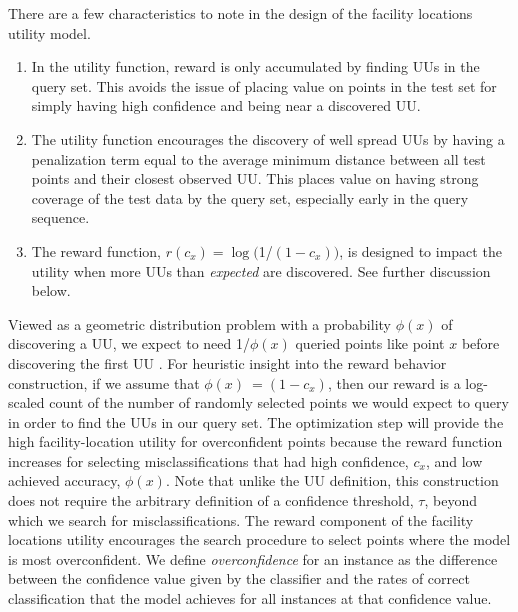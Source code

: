 \documentclass[10pt, conference]{IEEEtran}
\begin{document}
There are a few characteristics to note in the design of the facility locations utility model. 
\begin{enumerate}
	\item In the utility function, reward is only accumulated by finding UUs in the query set.  This avoids the issue of placing value on points in the test set for simply having high confidence and being near a discovered UU. 
	\item The utility function encourages the discovery of well spread UUs by having a penalization term equal to the average minimum distance between all test points and their closest observed UU. This places value on having strong coverage of the test data by the query set, especially early in the query sequence. 
	\item The reward function, $r\left(c_x\right) = \log($1/$(1-c_x))$, is designed to impact the utility when more UUs than {\it expected} are discovered.  See further discussion below. 

\end{enumerate}

Viewed as a geometric distribution problem with a probability $\phi(x)$ of discovering a UU, we expect to need 1/$\phi(x)$ queried points like point $x$ before discovering the first UU \cite{casella2002statistical}.  For heuristic insight into the reward behavior construction, if we assume that   $\phi(x) ~= (1-c_x )$, then our reward is a log-scaled count of the number of randomly selected points we would expect to query in order to find the UUs in our query set. 
The optimization step will provide the high facility-location utility for overconfident points because the reward function increases for selecting misclassifications that had high confidence, $c_x$, and low achieved accuracy, $\phi(x)$. Note that unlike the UU definition, this construction does not require the arbitrary definition of a confidence threshold, $\tau$, beyond which we search for misclassifications. The reward component of the facility locations utility encourages the search procedure to select points where the model is most overconfident. We define \textit{overconfidence} for an instance as the difference between the confidence value given by the classifier and the rates of correct classification that the model achieves for all instances at that confidence value. 
\end{document}
